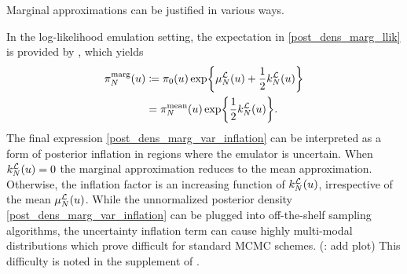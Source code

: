 \documentclass[12pt]{article}
\begin{document}
Marginal approximations can be justified in various ways. \todo

In the log-likelihood emulation setting, the expectation in \ref{post_dens_marg_llik} is provided by 
, which yields 
\begin{align}
\llikEmMargDens[\Ndesign](\Par) 
&\Def \priorDens(\Par) \Exp{\emMean[\Ndesign]{\llik}(\Par) + \frac{1}{2} \emKer[\Ndesign]{\llik}(\Par)} 
\label{post_dens_marg_llik_simplified} \\
&= \llikEmMeanDens[\Ndesign](\Par) \Exp{\frac{1}{2} \emKer[\Ndesign]{\llik}(\Par)}. 
\label{post_dens_marg_var_inflation}
\end{align}
The final expression \ref{post_dens_marg_var_inflation} can be interpreted as a form of posterior inflation 
in regions where the emulator is uncertain. When $\emKer[\Ndesign]{\llik}(\Par) = 0$ the marginal approximation 
reduces to the mean approximation. Otherwise, the inflation factor is an increasing function of 
$\emKer[\Ndesign]{\llik}(\Par)$, irrespective of the mean $\emMean[\Ndesign]{\llik}(\Par)$. 
While the unnormalized posterior density \ref{post_dens_marg_var_inflation}
can be plugged into off-the-shelf sampling algorithms, the uncertainty inflation term can cause highly multi-modal 
distributions which prove difficult for standard MCMC schemes. (\todo: add plot) This difficulty is noted in the 
supplement of \cite{VehtariParallelGP}. 
\end{document}
